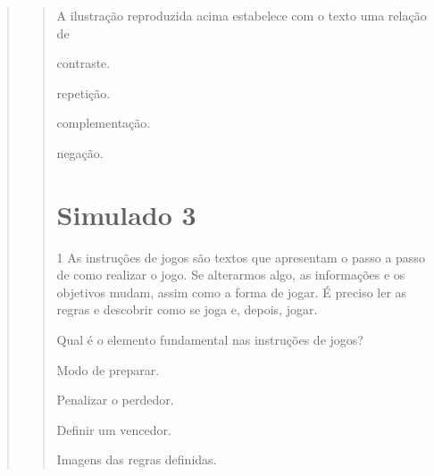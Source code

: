 \begin{escolha}
\begin{escolha}
\begin{escolha}
\begin{quote}
\begin{quote}

A ilustração reproduzida acima estabelece com o texto uma relação de

\begin{escolha}

  \item contraste.

  \item repetição.

  \item complementação.

  \item negação.

\end{escolha}


\chapter{Simulado 3}

\num{1} As instruções de jogos são textos que apresentam o passo a passo
de como realizar o jogo. Se alterarmos algo, as informações e os objetivos
mudam, assim como a forma de jogar. É preciso ler as regras e descobrir
como se joga e, depois, jogar.

Qual é o elemento fundamental nas instruções de jogos?

\begin{escolha}
\item Modo de preparar.

\item Penalizar o perdedor.

\item Definir um vencedor.

\item Imagens das regras definidas.
\end{escolha}


\end{quote}
\end{quote}
\end{escolha}
\end{escolha}
\end{escolha}
